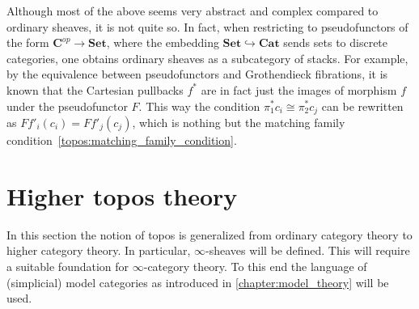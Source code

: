    \begin{remark}[1-sheaves]
        Although most of the above seems very abstract and complex compared to ordinary sheaves, it is not quite so. In fact, when restricting to pseudofunctors of the form $\mathbf{C}^{op}\rightarrow\mathbf{Set}$, where the embedding $\mathbf{Set}\hookrightarrow\mathbf{Cat}$ sends sets to discrete categories, one obtains ordinary sheaves as a subcategory of stacks. For example, by the equivalence between pseudofunctors and Grothendieck fibrations, it is known that the Cartesian pullbacks $f^*$ are in fact just the images of morphism $f$ under the pseudofunctor $F$. This way the condition $\pi_1^*c_i\cong\pi^*_2c_j$ can be rewritten as $Ff'_i(c_i)=Ff'_j(c_j)$, which is nothing but the matching family condition~\eqref{topos:matching_family_condition}.
    \end{remark}

\section{Higher topos theory}

    In this section the notion of topos is generalized from ordinary category theory to higher category theory. In particular, $\infty$-sheaves will be defined. This will require a suitable foundation for $\infty$-category theory. To this end the language of (simplicial) model categories as introduced in \cref{chapter:model_theory} will be used.


